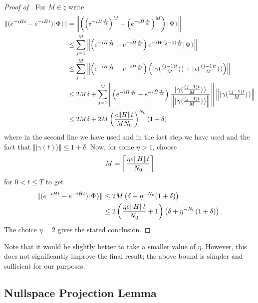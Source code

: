 \documentclass[../thesis-main/thesis-main]{subfiles}
\begin{document}
\begin{proof}[Proof of {}]
For $M \in \natural$ write
\begin{align*}
  \|{(e^{-iHt}-e^{-i\tilde{H}t}) |\mspace{2mu} \Phi \mspace{2mu} \rangle}\|
  &= \left\|{\left(\left(e^{-iH\frac{t}{M}}\right)^{M} -
     \left(e^{-i\tilde{H}\frac{t}{M}}\right)^{M}\right) |\mspace{2mu} \Phi \mspace{2mu} \rangle}\right\| \\
  & \leq \sum_{j=1}^{M} \left\|{\left(e^{-iH\frac{t}{M}} - 
     e^{-i\tilde{H}\frac{t}{M}}\right) e^{-iW\left(j-1\right)\frac{t}{M}}
     |\mspace{2mu} \Phi \mspace{2mu} \rangle}\right\| \\
  & \leq \sum_{j=1}^{M} 
    \left\|{\left(e^{-iH\frac{t}{M}} - e^{-i\tilde{H}\frac{t}{M}}\right)
    \left(|\mspace{2mu} \gamma(\tfrac{(j-1)t}{M}) \mspace{2mu} \rangle +
          |\mspace{2mu} \epsilon(\tfrac{(j-1)t}{M}) \mspace{2mu} \rangle\right)}\right\| \\
  & \leq 2M\delta+\sum_{j=1}^{M} 
    \left\|{ \left(e^{-iH\frac{t}{M}} - e^{-i\tilde{H}\frac{t}{M}}\right)
    \frac{|\mspace{2mu} \gamma(\tfrac{(j-1)t}{M}) \mspace{2mu} \rangle} 
         {\left\|{|\mspace{2mu} \gamma(\tfrac{(j-1)t}{M}) \mspace{2mu} \rangle}\right\|}}\right\|
    \left\|{|\mspace{2mu} \gamma(\tfrac{(j-1)t}{M}) \mspace{2mu} \rangle}\right\|\\ 
  & \leq 2M\delta 
    + 2M\left(\frac{e\|{H}\|t}{M N_0}\right)^{N_0}(1+\delta)
\end{align*}
where in the second line we have used  and in the last step we have used  and the fact that $\Vert |\gamma(t)\rangle\Vert \leq 1+\delta$.
Now, for some $\eta>1$, choose
\[
  M= \left\lceil \frac{\eta e\|{H}\|t}{N_0} \right\rceil
\]
for $0<t\leq T$ to get
\begin{align*}
  \|{(e^{-iHt}-e^{-i\tilde{H}t}) |\mspace{2mu} \Phi \mspace{2mu} \rangle}\|
  &\leq 2M\left(\delta + \eta^{-N_0}(1+\delta)\right) \\
  &\leq 2\left(\frac{\eta e\|{H}\|t}{N_0} + 1 \right) 
        \left(\delta + \eta^{-N_0}(1+\delta)\right).
\end{align*}
The choice $\eta=2$ gives the stated conclusion.
\end{proof}

Note that it would be slightly better to take a smaller value of $\eta$.  However, this does not significantly improve the final result; the above bound is simpler and sufficient for our purposes.


\subsection{Nullspace Projection Lemma}
\end{document}
